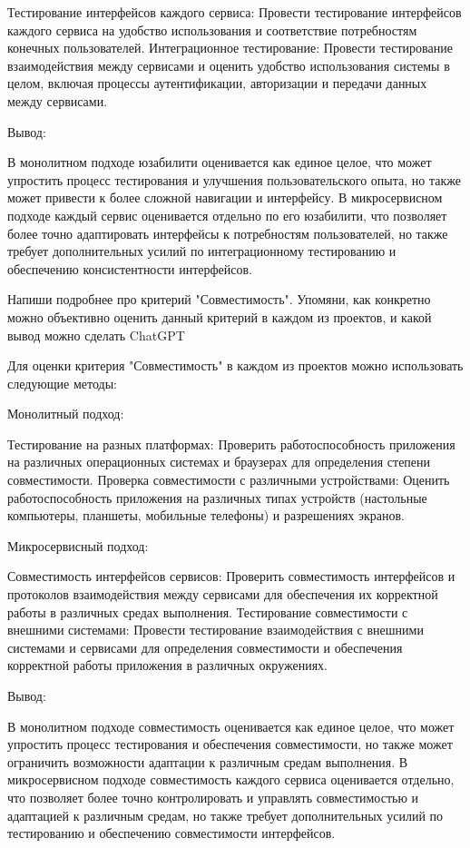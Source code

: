     Тестирование интерфейсов каждого сервиса: Провести тестирование интерфейсов каждого сервиса на удобство использования и соответствие потребностям конечных пользователей.
    Интеграционное тестирование: Провести тестирование взаимодействия между сервисами и оценить удобство использования системы в целом, включая процессы аутентификации, авторизации и передачи данных между сервисами.

Вывод:

    В монолитном подходе юзабилити оценивается как единое целое, что может упростить процесс тестирования и улучшения пользовательского опыта, но также может привести к более сложной навигации и интерфейсу.
    В микросервисном подходе каждый сервис оценивается отдельно по его юзабилити, что позволяет более точно адаптировать интерфейсы к потребностям пользователей, но также требует дополнительных усилий по интеграционному тестированию и обеспечению консистентности интерфейсов.

Напиши подробнее про критерий "Совместимость". Упомяни, как конкретно можно объективно оценить данный критерий в каждом из проектов, и какой вывод можно сделать
ChatGPT

Для оценки критерия "Совместимость" в каждом из проектов можно использовать следующие методы:

Монолитный подход:

    Тестирование на разных платформах: Проверить работоспособность приложения на различных операционных системах и браузерах для определения степени совместимости.
    Проверка совместимости с различными устройствами: Оценить работоспособность приложения на различных типах устройств (настольные компьютеры, планшеты, мобильные телефоны) и разрешениях экранов.

Микросервисный подход:

    Совместимость интерфейсов сервисов: Проверить совместимость интерфейсов и протоколов взаимодействия между сервисами для обеспечения их корректной работы в различных средах выполнения.
    Тестирование совместимости с внешними системами: Провести тестирование взаимодействия с внешними системами и сервисами для определения совместимости и обеспечения корректной работы приложения в различных окружениях.

Вывод:

    В монолитном подходе совместимость оценивается как единое целое, что может упростить процесс тестирования и обеспечения совместимости, но также может ограничить возможности адаптации к различным средам выполнения.
    В микросервисном подходе совместимость каждого сервиса оценивается отдельно, что позволяет более точно контролировать и управлять совместимостью и адаптацией к различным средам, но также требует дополнительных усилий по тестированию и обеспечению совместимости интерфейсов.

